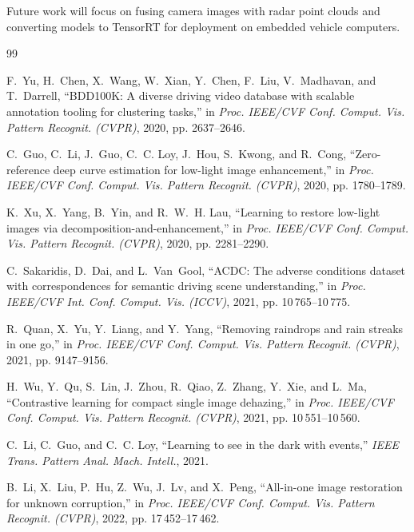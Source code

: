 \documentclass{article}
\begin{document}
Future work will focus on fusing camera images with radar point clouds and converting models to TensorRT for deployment on embedded vehicle computers.

\newpage
\begin{thebibliography}{99}

F.~Yu, H.~Chen, X.~Wang, W.~Xian, Y.~Chen, F.~Liu, V.~Madhavan, and T.~Darrell,
``BDD100K: A diverse driving video database with scalable annotation tooling for clustering tasks,''
in \emph{Proc. IEEE/CVF Conf. Comput. Vis. Pattern Recognit. (CVPR)}, 2020, pp. 2637--2646.

C.~Guo, C.~Li, J.~Guo, C.~C. Loy, J.~Hou, S.~Kwong, and R.~Cong,
``Zero-reference deep curve estimation for low-light image enhancement,''
in \emph{Proc. IEEE/CVF Conf. Comput. Vis. Pattern Recognit. (CVPR)}, 2020, pp. 1780--1789.

K.~Xu, X.~Yang, B.~Yin, and R.~W.~H. Lau,
``Learning to restore low-light images via decomposition-and-enhancement,''
in \emph{Proc. IEEE/CVF Conf. Comput. Vis. Pattern Recognit. (CVPR)}, 2020, pp. 2281--2290.

C.~Sakaridis, D.~Dai, and L.~Van~Gool,
``ACDC: The adverse conditions dataset with correspondences for semantic driving scene understanding,''
in \emph{Proc. IEEE/CVF Int. Conf. Comput. Vis. (ICCV)}, 2021, pp. 10\,765--10\,775.

R.~Quan, X.~Yu, Y.~Liang, and Y.~Yang,
``Removing raindrops and rain streaks in one go,''
in \emph{Proc. IEEE/CVF Conf. Comput. Vis. Pattern Recognit. (CVPR)}, 2021, pp. 9147--9156.

H.~Wu, Y.~Qu, S.~Lin, J.~Zhou, R.~Qiao, Z.~Zhang, Y.~Xie, and L.~Ma,
``Contrastive learning for compact single image dehazing,''
in \emph{Proc. IEEE/CVF Conf. Comput. Vis. Pattern Recognit. (CVPR)}, 2021, pp. 10\,551--10\,560.

C.~Li, C.~Guo, and C.~C. Loy,
``Learning to see in the dark with events,''
\emph{IEEE Trans. Pattern Anal. Mach. Intell.}, 2021.

B.~Li, X.~Liu, P.~Hu, Z.~Wu, J.~Lv, and X.~Peng,
``All-in-one image restoration for unknown corruption,''
in \emph{Proc. IEEE/CVF Conf. Comput. Vis. Pattern Recognit. (CVPR)}, 2022, pp. 17\,452--17\,462.


\end{thebibliography}
\end{document}
